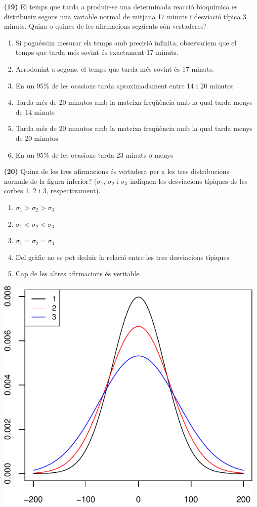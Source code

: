 \documentclass[
]{book}
\providecommand{\tightlist}{%
  \setlength{\itemsep}{0pt}\setlength{\parskip}{0pt}}
\theoremstyle{definition}
\theoremstyle{definition}
\theoremstyle{definition}
\theoremstyle{remark}
\begin{document}
\textbf{(19)} El temps que tarda a produir-se una determinada reacció bioquímica es distribueix segons una variable normal de mitjana 17 minuts i desviació típica 3 minuts. Quina o quines de les afirmacions següents són vertaderes?

\begin{enumerate}
\def\labelenumi{\arabic{enumi}.}
\tightlist
\item
  Si poguéssim mesurar els temps amb precisió infinita, observaríem que el temps que tarda més sovint és exactament 17 minuts.
\item
  Arrodonint a segons, el temps que tarda més sovint és 17 minuts.
\item
  En un 95\% de les ocasions tarda aproximadament entre 14 i 20 minutos
\item
  Tarda més de 20 minutos amb la mateixa freqüència amb la qual tarda menys de 14 minuts
\item
  Tarda més de 20 minutos amb la mateixa freqüència amb la qual tarda menys de 20 minutos
\item
  En un 95\% de les ocasions tarda 23 minuts o menys
\end{enumerate}

\textbf{(20)} Quina de les tres afirmacions és vertadera per a les tres distribucions normals de la figura inferior? (\(\sigma_1\), \(\sigma_2\) i \(\sigma_3\) indiquen les desviacions típiques de les corbes 1, 2 i 3, respectivament).

\begin{enumerate}
\def\labelenumi{\arabic{enumi}.}
\item
  \(\sigma_1> \sigma_2> \sigma_3\)
\item
  \(\sigma_1< \sigma_2< \sigma_3\)
\item
  \(\sigma_1= \sigma_2= \sigma_3\)
\item
  Del gràfic no es pot deduir la relació entre les tres desviacions típiques
\item
  Cap de les altres afirmacions és veritable.
\end{enumerate}

\begin{center}\includegraphics[width=0.5\linewidth]{Bioestadistica-II_files/figure-latex/unnamed-chunk-113-1} \end{center}
\end{document}
